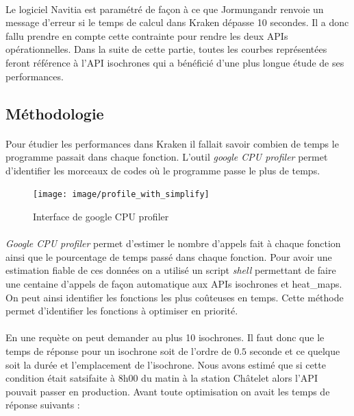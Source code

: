 \documentclass[a4paper]{report}
\begin{document}
\paragraph{}Le logiciel Navitia est paramétré de façon à ce que Jormungandr renvoie un message d'erreur si le temps de calcul dans Kraken dépasse 10 secondes. Il a donc fallu prendre en compte cette contrainte pour rendre les deux APIs opérationnelles. Dans la suite de cette partie, toutes les courbes représentées feront référence à l'API isochrones qui a bénéficié d'une plus longue étude de ses performances.

\subsection{Méthodologie}

\paragraph{} Pour étudier les performances dans Kraken il fallait savoir combien de temps le programme passait dans chaque fonction. L'outil \emph{google CPU profiler} permet d'identifier les morceaux de codes où le programme passe le plus de temps. 

\begin{figure}[H]
	\begin{center}
		\texttt{[image: image/profile\_with\_simplify]}
		\caption{Interface de google CPU profiler}
		\label{Interface de google CPU profiler}
	\end{center}
\end{figure}

\paragraph{} \emph{Google CPU profiler} permet d'estimer le nombre d'appels fait à chaque fonction ainsi que le pourcentage de temps passé dans chaque fonction. Pour avoir une estimation fiable de ces données on a utilisé un script \emph{shell} permettant de faire une centaine d'appels de façon automatique aux APIs isochrones et heat\_maps. On peut ainsi identifier les fonctions les plus coûteuses en temps. Cette méthode permet d'identifier les fonctions à optimiser en priorité. 

\paragraph{} En une requète on peut demander au plus 10 isochrones. Il faut donc que le temps de réponse pour un isochrone soit de l'ordre de $0.5$ seconde et ce quelque soit la durée et l'emplacement de l'isochrone. Nous avons estimé que si cette condition était satsifaite à 8h00 du matin à la station Châtelet alors l'API pouvait passer en production. Avant toute optimisation on avait les temps de réponse suivants :
\end{document}

